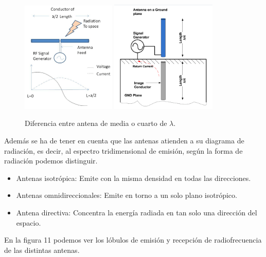 \documentclass[paper=a4, fontsize=11pt,twoside]{scrartcl}	%
\begin{document}
            \begin{center}
                \begin{figure}[h]
                    \centering
                    \includegraphics[width=0.4\textwidth]{antenna_design.png}
                    \includegraphics[width=0.45\textwidth]{antenna_design_monopole.png}
                    \caption{Diferencia entre antena de media o cuarto de $\lambda$.}
                    \label{fig:mesh8}
                \end{figure}
            \end{center}
            Además se ha de tener en cuenta que las antenas atienden a su diagrama de radiación, es decir, al
            espectro tridimensional de emisión, según la forma de radiación podemos distinguir.
            \begin{itemize}
                \item  Antenas isotrópica: Emite con la misma densidad en todas las direcciones.
                \item  Antenas omnidireccionales: Emite en torno a un solo plano isotrópico.
                \item  Antena directiva: Concentra la energía radiada en tan solo una dirección del espacio.
            \end{itemize}
            En la figura 11 podemos ver los lóbulos de emisión y recepción de radiofrecuencia de las distintas antenas.
\end{document}
